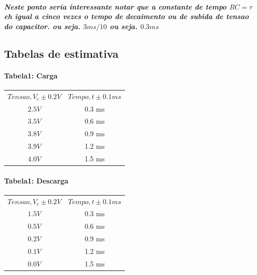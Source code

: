 \documentclass[12pt,twoside, a4paper, twocolumn]{article}
\begin{document}
\subparagraph*{Neste ponto seria interessante notar que a constante de tempo $RC = \tau$ eh igual a cinco vezes o tempo de decaimento ou de subida de tensao do capacitor. ou seja. $3ms/10$ ou seja. $0.3ms$}

\clearpage

\subsection{Tabelas de estimativa}


\paragraph*{Tabela1: Carga}
\begin{center}
    \begin{tabular}{ |cc| }
        \hline
        $Tensao, V_{c} \pm 0.2V$ & $Tempo, t \pm 0.1ms$ \\
        $2.5 V$                  & 0.3 ms               \\
        $3.5 V$                  & 0.6 ms               \\
        $3.8 V$                  & 0.9 ms               \\
        $3.9 V$                  & 1.2 ms               \\
        $4.0 V$                  & 1.5 ms               \\
        \hline
    \end{tabular}
\end{center}



\paragraph*{Tabela1: Descarga}
\begin{center}
    \begin{tabular}{ |cc| }
        \hline
        $Tensao, V_{c} \pm 0.2V$ & $Tempo, t \pm 0.1ms$ \\
        $1.5 V$                  & 0.3 ms               \\
        $0.5V$                   & 0.6 ms               \\
        $0.2 V$                  & 0.9 ms               \\
        $0.1 V$                  & 1.2 ms               \\
        $0.0 V$                  & 1.5 ms               \\
        \hline
    \end{tabular}
\end{center}
\end{document}
